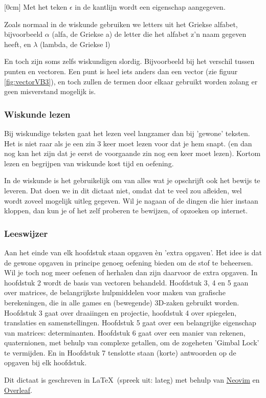 [0cm]
Met het teken {\color{nhl_blue} \LARGE $ \epsilon $ }  in de kantlijn wordt  een eigenschap aangegeven.

Zoals normaal in de wiskunde gebruiken we letters uit het Griekse alfabet, bijvoorbeeld $ \alpha $ (alfa, de Griekse a) de letter die het alfabet z'n naam gegeven heeft, en  $ \lambda $ (lambda, de Griekse l)

En toch zijn soms zelfs wiskundigen slordig. Bijvoorbeeld bij het verschil tussen punten en vectoren. Een punt is heel iets anders dan een vector  (zie figuur \ref{fig:vectorVB3}), en toch zullen de termen door elkaar gebruikt worden zolang er geen misverstand mogelijk is.

\subsubsection{Wiskunde lezen}
Bij wiskundige teksten gaat het lezen veel langzamer  dan bij 'gewone' teksten. Het is niet raar als je een zin 3 keer moet lezen voor dat je hem snapt. (en dan nog kan het zijn dat je eerst de voorgaande zin nog een keer moet lezen). Kortom lezen en begrijpen van wiskunde kost tijd en oefening. 

In de wiskunde is het gebruikelijk om van alles wat je opschrijft ook het bewijs te leveren. Dat doen we in dit dictaat niet, omdat dat te veel zou afleiden, wel wordt zoveel mogelijk uitleg gegeven. Wil je nagaan of de dingen die hier instaan kloppen, dan kun je of het zelf proberen te bewijzen, of opzoeken op internet.

\subsubsection{Leeswijzer}
Aan het einde van elk hoofdstuk staan opgaven èn 'extra opgaven'. Het idee is dat de gewone opgaven in principe genoeg oefening bieden om de stof te beheersen. Wil je toch nog meer oefenen of herhalen dan zijn daarvoor de extra opgaven. In hoofdstuk 2 wordt de basis van vectoren behandeld. Hoofdstuk 3, 4 en 5 gaan over matrices, de belangrijkste hulpmiddelen voor maken van grafische berekeningen, die in alle games en (bewegende) 3D-zaken gebruikt worden. Hoofdstuk 3 gaat over draaiingen en projectie, hoofdstuk 4 over spiegelen, translaties en samenstellingen. Hoofdstuk 5 gaat over een belangrijke eigenschap van matrices: determinanten. Hoofdstuk 6 gaat over een manier van rekenen, quaternionen, met behulp van complexe getallen, om de zogeheten 'Gimbal Lock' te vermijden. En in Hoofdstuk 7 tenslotte staan (korte) antwoorden op de opgaven bij elk hoofdstuk. 

Dit dictaat is geschreven in \LaTeX\ (spreek uit: lateg) met behulp van \href{https://neovim.io/}{Neovim} en \href{https://www.overleaf.com}{Overleaf}. 

